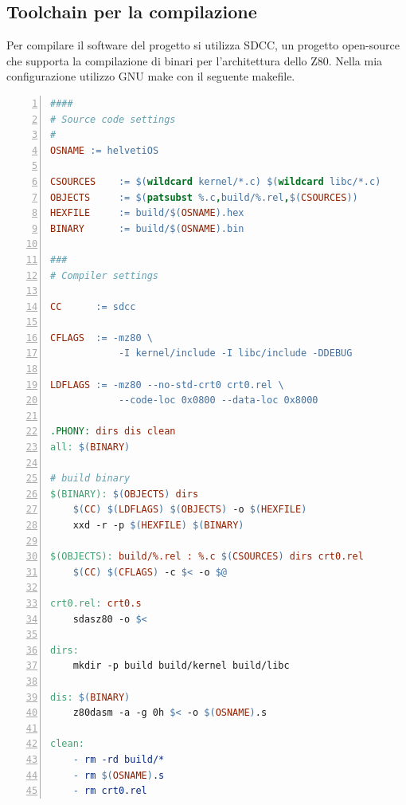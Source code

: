 \documentclass[a4paper, 11pt, twoside]{article}
\begin{document}

\subsection{Toolchain per la compilazione}

Per compilare il software del progetto si utilizza SDCC, un progetto
open-source che supporta la compilazione di binari per l'architettura dello
Z80. Nella mia configurazione utilizzo GNU make con il seguente makefile.

\newpage
\begin{lstlisting}[language=make, numbers=left, basicstyle=\ttfamily]
####
# Source code settings
#
OSNAME := helvetiOS

CSOURCES    := $(wildcard kernel/*.c) $(wildcard libc/*.c)
OBJECTS     := $(patsubst %.c,build/%.rel,$(CSOURCES))
HEXFILE     := build/$(OSNAME).hex
BINARY      := build/$(OSNAME).bin

###
# Compiler settings

CC      := sdcc

CFLAGS  := -mz80 \
            -I kernel/include -I libc/include -DDEBUG

LDFLAGS := -mz80 --no-std-crt0 crt0.rel \
            --code-loc 0x0800 --data-loc 0x8000

.PHONY: dirs dis clean
all: $(BINARY)

# build binary
$(BINARY): $(OBJECTS) dirs
    $(CC) $(LDFLAGS) $(OBJECTS) -o $(HEXFILE)
    xxd -r -p $(HEXFILE) $(BINARY)

$(OBJECTS): build/%.rel : %.c $(CSOURCES) dirs crt0.rel
    $(CC) $(CFLAGS) -c $< -o $@

crt0.rel: crt0.s
    sdasz80 -o $<

dirs:
    mkdir -p build build/kernel build/libc

dis: $(BINARY)
    z80dasm -a -g 0h $< -o $(OSNAME).s

clean:
    - rm -rd build/*
    - rm $(OSNAME).s
    - rm crt0.rel
\end{lstlisting}
\end{document}
